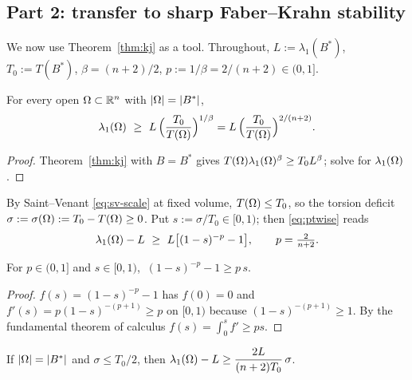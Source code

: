 \subsection{Part 2: transfer to sharp Faber--Krahn stability}
\label{ssec:transfer}

We now use Theorem~\ref{thm:kj} as a tool. Throughout, $L:=\lambda_1(B^*)$,
$T_0:=T(B^*)$, $\beta=(n+2)/2$, $p:=1/\beta=2/(n+2)\in(0,1]$.

\begin{lemma}\label{lem:ptwise}
For every open $\Omega\subset\mathbb R^n$ with $\left|\Omega\right|=\left|B^*\right|$,
\begin{equation}\label{eq:ptwise}
  \lambda_1(\Omega)\ \ge\ L\,\Bigl(\frac{T_0}{T(\Omega)}\Bigr)^{1/\beta}
  =L\,\Bigl(\frac{T_0}{T(\Omega)}\Bigr)^{2/(n+2)} .
\end{equation}
\end{lemma}

\begin{proof}
Theorem~\ref{thm:kj} with $B=B^*$ gives
$T(\Omega)\lambda_1(\Omega)^\beta\ge T_0 L^\beta$; solve for $\lambda_1(\Omega)$.
\end{proof}

By Saint--Venant \eqref{eq:sv-scale} at fixed volume, $T(\Omega)\le T_0$, so
the torsion deficit $\sigma:=\sigma(\Omega):=T_0-T(\Omega)\ge0$. Put
$s:=\sigma/T_0\in[0,1)$; then \eqref{eq:ptwise} reads
\begin{equation}\label{eq:ptwise-s}
  \lambda_1(\Omega)-L\ \ge\ L\bigl[(1-s)^{-p}-1\bigr],\qquad p=\tfrac{2}{n+2}.
\end{equation}

\begin{lemma}\label{lem:onevar}
For $p\in(0,1]$ and $s\in[0,1)$, $\ (1-s)^{-p}-1\ge p\,s$.
\end{lemma}

\begin{proof}
$f(s)=(1-s)^{-p}-1$ has $f(0)=0$ and $f'(s)=p(1-s)^{-(p+1)}\ge p$ on
$[0,1)$ because $(1-s)^{-(p+1)}\ge1$. By the fundamental theorem of
calculus $f(s)=\int_0^s f'\ge ps$.
\end{proof}

\begin{lemma}\label{lem:small}
If $\left|\Omega\right|=\left|B^*\right|$ and $\sigma\le T_0/2$, then
$\displaystyle\lambda_1(\Omega)-L\ge\frac{2L}{(n+2)T_0}\,\sigma$.
\end{lemma}

